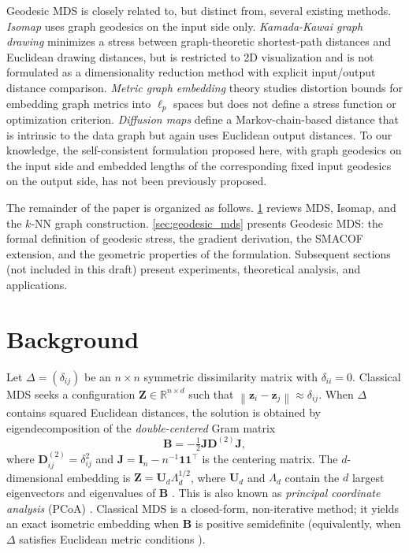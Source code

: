 \documentclass[11pt]{article}
\newcommand{\R}{\mathbb{R}}
\newcommand{\bz}{\mathbf{z}}
\newcommand{\bZ}{\mathbf{Z}}
\newcommand{\bD}{\mathbf{D}}
\newcommand{\bB}{\mathbf{B}}
\newcommand{\bI}{\mathbf{I}}
\newcommand{\bJ}{\mathbf{J}}
\newcommand{\bU}{\mathbf{U}}
\newcommand{\norm}[1]{\left\|#1\right\|}
\begin{document}
Geodesic MDS is closely related to, but distinct from, several existing
methods.  \emph{Isomap} \citep{tenenbaum2000global} uses graph geodesics
on the input side only.  \emph{Kamada-Kawai graph drawing}
\citep{kamada1989algorithm} minimizes a stress between graph-theoretic
shortest-path distances and Euclidean drawing distances, but is restricted
to 2D visualization and is not formulated as a dimensionality reduction
method with explicit input/output distance comparison.  \emph{Metric graph
embedding} theory \citep{bourgain1985lipschitz,
linial1994geometry} studies distortion bounds for embedding graph metrics
into $\ell_p$ spaces but does not define a stress function or optimization
criterion.  \emph{Diffusion maps} \citep{coifman2006diffusion} define a
Markov-chain-based distance that is intrinsic to the data graph but again
uses Euclidean output distances.  To our knowledge, the self-consistent
formulation proposed here, with graph geodesics on the input side and
embedded lengths of the corresponding fixed input geodesics on the output
side, has not been previously proposed.

The remainder of the paper is organized as follows.
\cref{sec:background} reviews MDS, Isomap, and the $k$-NN graph construction.
\cref{sec:geodesic_mds} presents Geodesic MDS: the formal definition of
geodesic stress, the gradient derivation, the SMACOF extension, and the
geometric properties of the formulation.
Subsequent sections (not included in this draft) present experiments,
theoretical analysis, and applications.

\section{Background}
\label{sec:background}

Let $\Delta = (\delta_{ij})$ be an $n \times n$ symmetric dissimilarity
matrix with $\delta_{ii} = 0$.  Classical MDS
\citep{torgerson1952multidimensional, young1938discussion} seeks a
configuration $\bZ \in \R^{n \times d}$ such that
$\norm{\bz_i - \bz_j} \approx \delta_{ij}$.  When $\Delta$ contains
squared Euclidean distances, the solution is obtained by eigendecomposition
of the \emph{double-centered} Gram matrix
\begin{equation}
  \bB = -\tfrac{1}{2} \bJ \bD^{(2)} \bJ,
  \label{eq:gram}
\end{equation}
where $\bD^{(2)}_{ij} = \delta_{ij}^2$ and
$\bJ = \bI_n - n^{-1}\mathbf{1}\mathbf{1}^\top$ is the centering matrix.
The $d$-dimensional embedding is
$\bZ = \bU_d \Lambda_d^{1/2}$, where $\bU_d$ and $\Lambda_d$ contain the
$d$ largest eigenvectors and eigenvalues of $\bB$
\citep{eckart1936approximation, gower1966some}.
This is also known as \emph{principal coordinate analysis} (PCoA)
\citep{gower1966some}.  Classical MDS is a closed-form, non-iterative
method; it yields an exact isometric embedding when $\bB$ is positive
semidefinite (equivalently, when $\Delta$ satisfies Euclidean metric
conditions \citep{schoenberg1935remarks}).
\end{document}
